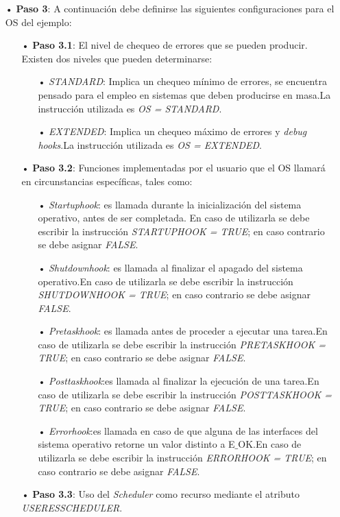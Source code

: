 \documentclass[12pt,letterpaper]{article}
\begin{document}
\begin{enumerate}
\item[•]\textbf{Paso 3}: A continuación debe definirse las siguientes configuraciones para el OS del ejemplo:
\begin{enumerate}
\item[•]\textbf{Paso 3.1}: El nivel de chequeo de errores que se pueden producir. Existen dos niveles que pueden determinarse:
\begin{enumerate}
\item[•]\textit{STANDARD}: Implica un chequeo mínimo de errores, se encuentra pensado para el empleo en sistemas que deben producirse en masa.La instrucción utilizada es \textit{OS = STANDARD}. 
\item[•]\textit{EXTENDED}: Implica un chequeo máximo de errores y \textit{debug hooks}.La instrucción utilizada es \textit{OS = EXTENDED}.
\end{enumerate}
\item[•]\textbf{Paso 3.2}: Funciones implementadas por el usuario que el OS llamará en circunstancias específicas, tales como:
\begin{enumerate}
\item[•]\textit{Startuphook}: es  llamada  durante  la  inicialización  del  sistema  operativo,  antes  de  ser completada. En caso de utilizarla se debe escribir la instrucción \textit{STARTUPHOOK = TRUE}; en caso contrario se debe asignar \textit{FALSE}.
\item[•]\textit{Shutdownhook}: es llamada al finalizar el apagado del sistema operativo.En caso de utilizarla se debe escribir la instrucción \textit{SHUTDOWNHOOK = TRUE}; en caso contrario se debe asignar \textit{FALSE}.
\item[•]\textit{Pretaskhook}: es llamada antes de proceder a ejecutar una tarea.En caso de utilizarla se debe escribir la instrucción \textit{PRETASKHOOK = TRUE}; en caso contrario se debe asignar \textit{FALSE}.
\item[•]\textit{Posttaskhook}:es llamada al finalizar la ejecución de una tarea.En caso de utilizarla se debe escribir la instrucción \textit{POSTTASKHOOK = TRUE}; en caso contrario se debe asignar \textit{FALSE}.
\item[•]\textit{Errorhook}:es llamada en caso de que alguna de las interfaces del sistema operativo retorne un valor distinto a E$\_$OK.En caso de utilizarla se debe escribir la instrucción \textit{ERRORHOOK = TRUE}; en caso contrario se debe asignar \textit{FALSE}.
\end{enumerate}
\item[•]\textbf{Paso 3.3}: Uso del \textit{Scheduler} como recurso mediante el atributo \textit{USERESSCHEDULER}.

\end{enumerate}
\end{enumerate}
\end{document}
